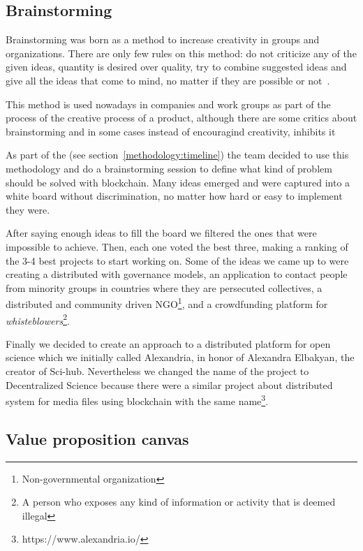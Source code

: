 \subsection{Brainstorming}

Brainstorming was born as a method to increase creativity in groups and
organizations. There are only few rules on this method: do not criticize any of
the given ideas, quantity is desired over quality, try to combine suggested
ideas and give all the ideas that come to mind, no matter if they are possible
or not~\cite{osborn1953applied}.

This method is used nowadays in companies and work groups as part of the process
of the creative process of a product, although there are some critics about
brainstorming and in some cases instead of encouragind creativity, inhibits
it~\cite{sutton1996brainstorming,mullen1991productivity}

As part of the (see section~\ref{methodology:timeline}) the team
decided to use this methodology and do a brainstorming session to define what
kind of problem should be solved with blockchain. Many ideas emerged and were
captured into a white board without discrimination, no matter how hard or easy
to implement they were.

After saying enough ideas to fill the board we filtered the ones that were
impossible to achieve. Then, each one voted the best three, making a ranking of
the 3-4 best projects to start working on. Some of the ideas we came up to were
creating a distributed  with governance models, an application to
contact people from minority groups in countries where they are persecuted
collectives, a distributed and community driven NGO\footnote{Non-governmental
  organization}, and a crowdfunding platform for \emph{whisteblowers}\footnote{A
  person who exposes any kind of information or activity that is deemed
  illegal}.

Finally we decided to create an approach to a distributed platform for open
science which we initially called Alexandria, in honor of Alexandra Elbakyan,
the creator of Sci-hub. Nevertheless we changed the name of the project to
Decentralized Science because there were a similar project about distributed
system for media files using blockchain with the same
name\footnote{https://www.alexandria.io/}.

\subsection{Value proposition canvas}
\label{sec:value-prop-canv}

